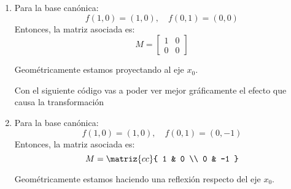 \begin{enumerate}[label=(\alph*)]
  \item Para la base canónica:
        $$
          f(1,0) = (1,0), \quad f(0,1) = (0,0)
        $$
        Entonces, la matriz asociada es:
        $$
          M =
          \begin{bmatrix}
            1 & 0 \\
            0 & 0
          \end{bmatrix}
        $$
        \begin{minipage}{0.5\textwidth}
          Geométricamente estamos proyectando al eje $x_0$.
        \end{minipage}
        \begin{minipage}{0.5\textwidth}
        \end{minipage}

        Con el siguiente código vas a poder ver mejor gráficamente el efecto que causa la transformación
        \copyPaste

  \item Para la base canónica:
        $$
          f(1,0) = (1,0), \quad f(0,1) = (0,-1)
        $$
        Entonces, la matriz asociada es:
        $$
          M =
          \matriz{cc}{
            1 & 0  \\
            0 & -1
          }
        $$
        \begin{minipage}{0.65\textwidth}
          Geométricamente estamos haciendo una reflexión respecto del eje $x_0$.
        \end{minipage}
        \begin{minipage}{0.35\textwidth}
\end{minipage}
\end{enumerate}
